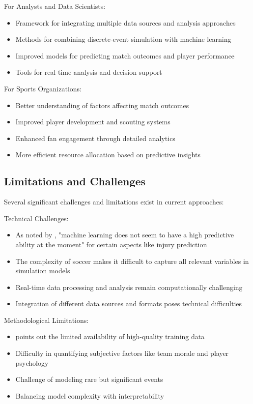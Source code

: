\documentclass[10pt,journal,compsoc]{IEEEtran}
\begin{document}
For Analysts and Data Scientists:
\begin{itemize}
    \item Framework for integrating multiple data sources and analysis approaches
    \item Methods for combining discrete-event simulation with machine learning
    \item Improved models for predicting match outcomes and player performance
    \item Tools for real-time analysis and decision support
\end{itemize}

For Sports Organizations:
\begin{itemize}
    \item Better understanding of factors affecting match outcomes
    \item Improved player development and scouting systems
    \item Enhanced fan engagement through detailed analytics
    \item More efficient resource allocation based on predictive insights
\end{itemize}

\subsection{Limitations and Challenges}
Several significant challenges and limitations exist in current approaches:

Technical Challenges:
\begin{itemize}
    \item As noted by \cite{nassis2023review}, "machine learning does not seem to have a high predictive ability at the moment" for certain aspects like injury prediction
    \item The complexity of soccer makes it difficult to capture all relevant variables in simulation models
    \item Real-time data processing and analysis remain computationally challenging
    \item Integration of different data sources and formats poses technical difficulties
\end{itemize}

Methodological Limitations:
\begin{itemize}
    \item \cite{dambroz2022effect} points out the limited availability of high-quality training data
    \item Difficulty in quantifying subjective factors like team morale and player psychology
    \item Challenge of modeling rare but significant events
    \item Balancing model complexity with interpretability
\end{itemize}
\end{document}
